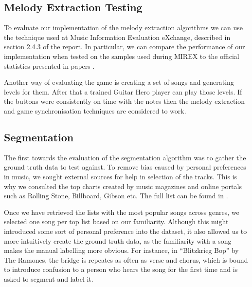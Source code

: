 \subsection{Melody Extraction Testing}
To evaluate our implementation of the melody extraction algorithms we can use the technique used at Music Information Evaluation eXchange, described in section 2.4.3 of the report. In particular, we can compare the performance of our implementation when tested on the samples used during MIREX to the official statistics presented in papers \cite{salamon, comparison}.

Another way of evaluating the game is creating a set of songs and generating levels for them. After that a trained Guitar Hero player can play those levels. If the buttons were consistently on time with the notes then the melody extraction and game synchronisation techniques are considered to work.


\subsection{Segmentation}

The first towards the evaluation of the segmentation algorithm was to gather the ground truth data to test against. To remove bias caused by personal preferences in music, we sought external sources for help in selection of the tracks. This is why we consulted the top charts created by music magazines and online portals such as Rolling Stone, Billboard, Gibson etc. The full list can be found in \cite{toplists}.

Once we have retrieved the lists with the most popular songs across genres, we selected one song per top list based on our familiarity. Although this might introduced some sort of personal preference into the dataset, it also allowed us to more intuitively create the ground truth data, as the familiarity with a song makes the manual labelling more obvious. For instance, in “Blitzkrieg Bop” by The Ramones, the bridge is repeates as often as verse and chorus, which is bound to introduce confusion to a person who hears the song for the first time and is asked to segment and label it.

